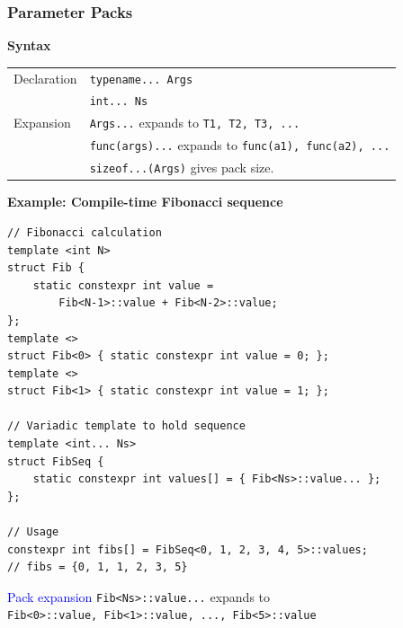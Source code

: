 \subsubsection{Parameter Packs}

\textbf{Syntax}\\
\begin{tabularx}{\linewidth}{lX}
    \hline
    Declaration & \texttt{typename... Args}\\
                & \texttt{int... Ns}\\
    \hline
    Expansion & \texttt{Args...} expands to \texttt{T1, T2, T3, ...}\\
              & \texttt{func(args)...} expands to \texttt{func(a1), func(a2), ...}\\
              & \texttt{sizeof...(Args)} gives pack size.\\
    \hline
\end{tabularx}

\textbf{Example: Compile-time Fibonacci sequence}

\begin{mdframed}[nobreak=true,backgroundcolor=gray!10,linecolor=Firebrick4]
\begin{verbatim}
// Fibonacci calculation
template <int N>
struct Fib {
    static constexpr int value =
        Fib<N-1>::value + Fib<N-2>::value;
};
template <>
struct Fib<0> { static constexpr int value = 0; };
template <> 
struct Fib<1> { static constexpr int value = 1; };

// Variadic template to hold sequence
template <int... Ns>
struct FibSeq {
    static constexpr int values[] = { Fib<Ns>::value... };
};

// Usage
constexpr int fibs[] = FibSeq<0, 1, 2, 3, 4, 5>::values;
// fibs = {0, 1, 1, 2, 3, 5}
\end{verbatim}
\end{mdframed}

\textcolor{blue}{Pack expansion} \texttt{Fib<Ns>::value...} expands to\\
\texttt{Fib<0>::value, Fib<1>::value, ..., Fib<5>::value}

